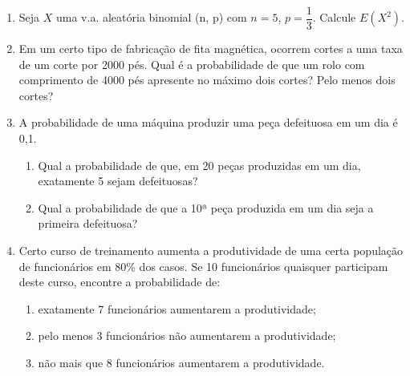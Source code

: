 \begin{enumerate}
\item Seja $X$ uma v.a. aleatória binomial (n, p) com $n = 5$, $p=\dfrac{1}{3}$. Calcule $E(X^{2})$.


\item Em um certo tipo de fabricação de fita magnética, ocorrem cortes a uma taxa de um corte por 2000 pés. Qual é a probabilidade de que um rolo com comprimento de 4000 pés apresente no máximo dois cortes? Pelo menos dois cortes?


\setcounter{enumi}{9}
\item A probabilidade de uma máquina produzir uma peça defeituosa em um dia é 0,1.

	\begin{enumerate}[label=\alph*)]
		\item Qual a probabilidade de que, em 20 peças produzidas em um dia, exatamente 5 sejam defeituosas?
		
		
		\item Qual a probabilidade de que a 10ª peça produzida em um dia seja a primeira defeituosa?
	\end{enumerate}

\item Certo curso de treinamento aumenta a produtividade de uma certa população de funcionários em 80\% dos casos. Se 10 funcionários quaisquer participam deste curso, encontre a probabilidade de:
	\begin{enumerate}[label=\alph*)]
		\item exatamente 7 funcionários aumentarem a produtividade;
		\item pelo menos 3 funcionários não aumentarem a produtividade;
		\item não mais que 8 funcionários aumentarem a produtividade.
	\end{enumerate}
\end{enumerate}

